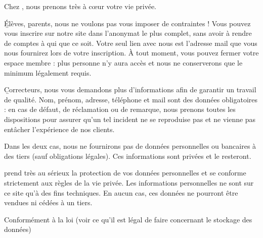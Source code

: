 Chez \eDevoir, nous prenons très à cœur votre vie privée.

\b{Élèves}, \b{parents}, nous ne voulons pas vous imposer de contraintes ! Vous pouvez vous inscrire sur notre site dans l'anonymat le plus complet, sans avoir à rendre de comptes à qui que ce soit. Votre seul lien avec nous est l'adresse mail que vous nous fournirez lors de votre inscription. À tout moment, vous pouvez fermer votre espace membre : plus personne n'y aura accès et nous ne conserverons que le minimum légalement requis.

\b{Correcteurs}, nous vous demandons plus d'informations afin de garantir un travail de qualité.  Nom, prénom, adresse, téléphone et mail sont des données obligatoires : en cas de défaut, de réclamation ou de remarque, nous prenons toutes les dispositions pour assurer qu'un tel incident ne se reproduise pas et ne vienne pas entâcher l'expérience de nos clients.

Dans les deux cas, nous ne fournirons pas de données personnelles ou bancaires à des tiers (sauf obligations légales). Ces informations sont privées et le resteront.

\eDevoir prend très au sérieux la protection de vos données personnelles et se conforme strictement aux règles de la vie privée. Les informations personnelles ne sont sur ce site qu'à des fins techniques. En aucun cas, ces données ne pourront être vendues ni cédées à un tiers.

Conformément à la loi (voir ce qu'il est légal de faire concernant le stockage des données)